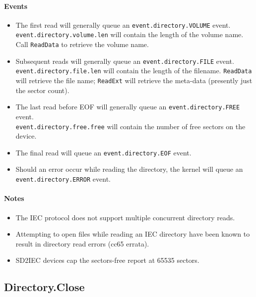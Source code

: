 \paragraph{Events}
\begin{itemize}
\item The first read will generally queue an \verb+event.directory.VOLUME+ event. \\ \verb+event.directory.volume.len+ will contain the length of the volume name. Call \verb+ReadData+ to retrieve the volume name.

\item Subsequent reads will generally queue an \verb+event.directory.FILE+ event. \\ \verb+event.directory.file.len+ will contain the length of the filename.  \verb+ReadData+ will retrieve the file name; \verb+ReadExt+ will retrieve the meta-data (presently just the sector count).

\item The last read before EOF will generally queue an \verb+event.directory.FREE+ event. \\ \verb+event.directory.free.free+ will contain the number of free sectors on the device.

\item The final read will queue an \verb+event.directory.EOF+ event.

\item Should an error occur while reading the directory, the kernel will queue an \\ \verb+event.directory.ERROR+ event.
\end{itemize}

\paragraph{Notes}
\begin{itemize}
\item The IEC protocol does not support multiple concurrent directory reads.
\item Attempting to open files while reading an IEC directory have been known to result in directory read errors (cc65 errata). 
\item SD2IEC devices cap the sectors-free report at 65535 sectors.
\end{itemize}


\subsection*{Directory.Close}


